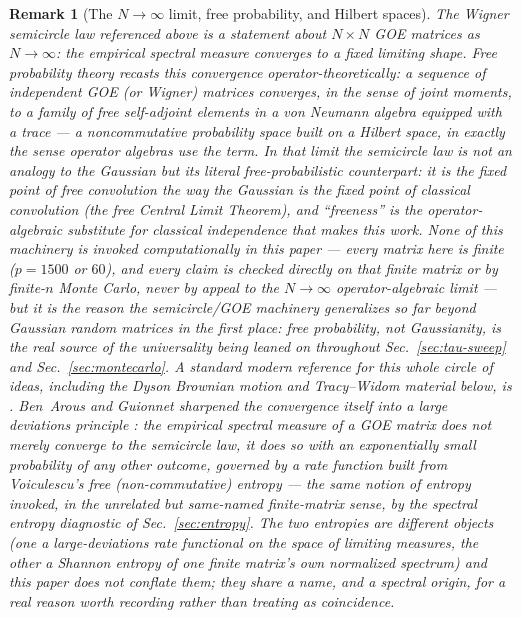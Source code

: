 \documentclass[11pt]{article}
\newtheorem{remark}{Remark}
\begin{document}
\begin{remark}[The $N\to\infty$ limit, free probability, and Hilbert spaces]
The Wigner semicircle law referenced above is a statement about
$N\times N$ GOE matrices as $N\to\infty$: the empirical spectral
measure converges to a fixed limiting shape. Free probability theory
\citep{voiculescu1991} recasts this convergence operator-theoretically:
a sequence of independent GOE (or Wigner) matrices converges, in the
sense of joint moments, to a family of \emph{free} self-adjoint
elements in a von Neumann algebra equipped with a trace --- a
noncommutative probability space built on a Hilbert space, in exactly
the sense operator algebras use the term. In that limit the semicircle
law is not an analogy to the Gaussian but its literal free-probabilistic
counterpart: it is the fixed point of free convolution the way the
Gaussian is the fixed point of classical convolution (the free Central
Limit Theorem), and ``freeness'' is the operator-algebraic
substitute for classical independence that makes this work. None of
this machinery is invoked computationally in this paper --- every
matrix here is finite ($p=1500$ or $60$), and every claim is checked
directly on that finite matrix or by finite-$n$ Monte Carlo, never by
appeal to the $N\to\infty$ operator-algebraic limit --- but it is the
reason the semicircle/GOE machinery generalizes so far beyond Gaussian
random matrices in the first place: free probability, not Gaussianity,
is the real source of the universality being leaned on throughout
Sec.~\ref{sec:tau-sweep} and Sec.~\ref{sec:montecarlo}. A standard
modern reference for this whole circle of ideas, including the
Dyson Brownian motion and Tracy--Widom material below, is
\citet{aguz2010}. Ben~Arous and Guionnet sharpened the convergence
itself into a large deviations principle \citep{benarousguionnet1997}:
the empirical spectral measure of a GOE matrix does not merely converge
to the semicircle law, it does so with an exponentially small
probability of any other outcome, governed by a rate function built
from Voiculescu's free (non-commutative) entropy --- the same notion
of entropy invoked, in the unrelated but same-named finite-matrix
sense, by the spectral entropy diagnostic of
Sec.~\ref{sec:entropy}. The two entropies are different
objects (one a large-deviations rate functional on the space of
limiting measures, the other a Shannon entropy of one finite matrix's
own normalized spectrum) and this paper does not conflate them; they
share a name, and a spectral origin, for a real reason worth
recording rather than treating as coincidence.
\end{remark}
\end{document}
